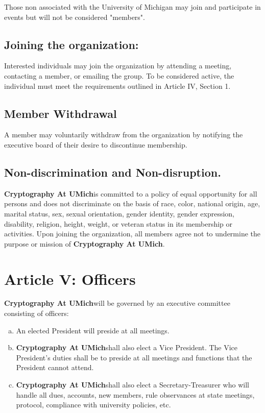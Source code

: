 \documentclass[11pt]{article}
\newcommand{\orgname}{\textbf{Cryptography At UMich}}
\begin{document}
    Those non associated with the University of Michigan may join and participate in events but will not be considered "members".

    \subsection{Joining the organization:}

    Interested individuals may join the organization by attending a meeting, contacting a member, or emailing the group.
    To be considered active, the individual must meet the requirements outlined in Article IV, Section 1.

    \subsection{Member Withdrawal}

    A member may voluntarily withdraw from the organization by notifying the executive board of their desire to discontinue membership.

    \subsection{Non-discrimination and Non-disruption. }

    \orgname is committed to a policy of equal opportunity for all persons and does not discriminate on the basis of race, color, national origin, age, marital status, sex, sexual orientation, gender identity, gender expression, disability, religion, height, weight, or veteran status in its membership or activities.
    Upon joining the organization, all members agree not to undermine the purpose or mission of \orgname.


    \section{Article V: Officers}

    \orgname will be governed by an executive committee consisting of officers:

    \begin{enumerate}
        [a)]
        \item An elected President will preside at all meetings.
        \item \orgname shall also elect a Vice President.
        The Vice President's duties shall be to preside at all meetings and functions that the President cannot attend.
        \item \orgname shall also elect a Secretary-Treasurer who will handle all dues, accounts, new members, rule observances at state meetings, protocol, compliance with university policies, etc.
    \end{enumerate}
\end{document}
